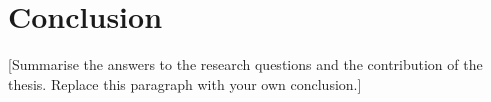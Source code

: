 \chapter{Conclusion}
[Summarise the answers to the research questions and the contribution of the
thesis. Replace this paragraph with your own conclusion.]
